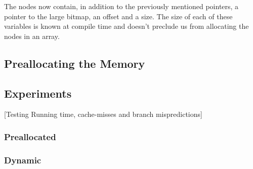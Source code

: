 The nodes now contain, in addition to the previously mentioned pointers, a pointer to the large bitmap, an offset and a size.
The size of each of these variables is known at compile time and doesn't preclude us from allocating the nodes in an array.

\subsection{Preallocating the Memory}

\subsection{Experiments}
[Testing Running time, cache-misses and branch mispredictions]
\subsubsection{Preallocated}

\subsubsection{Dynamic}




